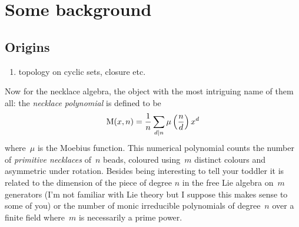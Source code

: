 \section{Some background}
\subsection{Origins}
\begin{enumerate}
  \item topology on cyclic sets, closure etc.
\end{enumerate}

Now for the necklace algebra, the object with the most intriguing name of them all: the \emph{necklace polynomial} is defined to be
\begin{equation}
  \mathrm{M}(x,n)=\frac{1}{n}\sum_{d\mathbin{|} n}\mu\left( \frac{n}{d} \right)x^d
\end{equation}
where~$\mu$ is the Moebius function. This numerical polynomial counts the number of \emph{primitive necklaces} of~$n$ beads, coloured using~$m$ distinct colours and asymmetric under rotation. Besides being interesting to tell your toddler it is related to the dimension of the piece of degree $n$ in the free Lie algebra on~$m$ generators (I'm not familiar with Lie theory but I suppose this makes sense to some of you) or the number of monic irreducible polynomials of degree~$n$ over a finite field where~$m$ is necessarily a prime power.
